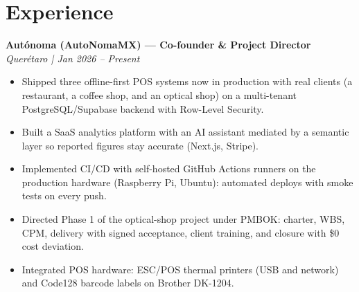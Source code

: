 \documentclass[10pt,letterpaper]{article}
\begin{document}
\section*{Experience}
\textbf{Autónoma (AutoNomaMX) — Co-founder \& Project Director}\\
\textit{Querétaro | Jan 2026 -- Present}
\begin{itemize}[leftmargin=*]
  \item Shipped three offline-first POS systems now in production with real clients (a restaurant, a coffee shop, and an optical shop) on a multi-tenant PostgreSQL/Supabase backend with Row-Level Security.
  \item Built a SaaS analytics platform with an AI assistant mediated by a semantic layer so reported figures stay accurate (Next.js, Stripe).
  \item Implemented CI/CD with self-hosted GitHub Actions runners on the production hardware (Raspberry Pi, Ubuntu): automated deploys with smoke tests on every push.
  \item Directed Phase 1 of the optical-shop project under PMBOK: charter, WBS, CPM, delivery with signed acceptance, client training, and closure with \$0 cost deviation.
  \item Integrated POS hardware: ESC/POS thermal printers (USB and network) and Code128 barcode labels on Brother DK-1204.
\end{itemize}
\end{document}

